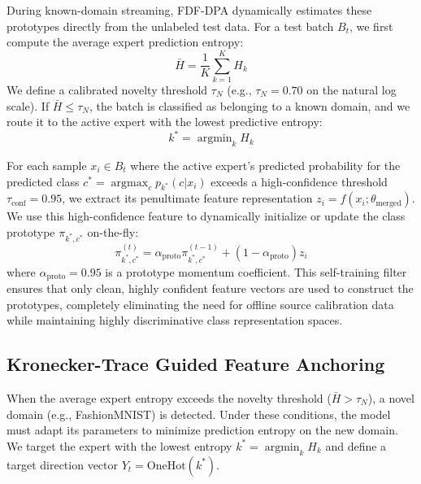 \documentclass{article}
\theoremstyle{plain}
\theoremstyle{definition}
\theoremstyle{remark}
\begin{document}
During known-domain streaming, FDF-DPA dynamically estimates these prototypes directly from the unlabeled test data. For a test batch $B_t$, we first compute the average expert prediction entropy:
\begin{equation}
\bar{H} = \frac{1}{K} \sum_{k=1}^K H_k
\end{equation}
We define a calibrated novelty threshold $\tau_N$ (e.g., $\tau_N = 0.70$ on the natural log scale). If $\bar{H} \leq \tau_N$, the batch is classified as belonging to a known domain, and we route it to the active expert with the lowest predictive entropy:
\begin{equation}
k^* = \operatorname{argmin}_k H_k
\end{equation}

For each sample $x_i \in B_t$ where the active expert's predicted probability for the predicted class $c^* = \operatorname{argmax}_c p_{k^*}(c|x_i)$ exceeds a high-confidence threshold $\tau_{\text{conf}} = 0.95$, we extract its penultimate feature representation $z_i = f(x_i; \theta_{\text{merged}})$. We use this high-confidence feature to dynamically initialize or update the class prototype $\pi_{k^*, c^*}$ on-the-fly:
\begin{equation}
\pi_{k^*,c^*}^{(t)} = \alpha_{\text{proto}} \pi_{k^*,c^*}^{(t-1)} + (1 - \alpha_{\text{proto}}) z_i
\end{equation}
where $\alpha_{\text{proto}} = 0.95$ is a prototype momentum coefficient. This self-training filter ensures that only clean, highly confident feature vectors are used to construct the prototypes, completely eliminating the need for offline source calibration data while maintaining highly discriminative class representation spaces.

\subsection{Kronecker-Trace Guided Feature Anchoring}
When the average expert entropy exceeds the novelty threshold ($\bar{H} > \tau_N$), a novel domain (e.g., FashionMNIST) is detected. Under these conditions, the model must adapt its parameters to minimize prediction entropy on the new domain. We target the expert with the lowest entropy $k^* = \operatorname{argmin}_k H_k$ and define a target direction vector $Y_t = \text{OneHot}(k^*)$.
\end{document}
